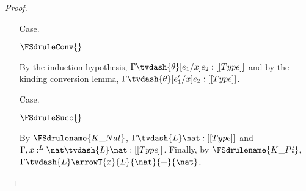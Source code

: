 \begin{proof}
\begin{itemize}
  \item[Case.] \ \\
    \begin{center}
      $\FSdruleConv{}$
    \end{center}
    By the induction hypothesis, $\Gamma \tvdash{\theta} [e_1/x]e_2:[[Type]]$ and by the kinding 
    conversion lemma, $\Gamma \tvdash{\theta} [e'_1/x]e_2:[[Type]]$.

  \item[Case.] \ \\
    \begin{center}
      $\FSdruleSucc{}$
    \end{center}
    By $\FSdrulename{K\_Nat}$, $\Gamma \tvdash{L} \nat:[[Type]]$ and 
    $\Gamma,x:^L \nat \tvdash{L} \nat:[[Type]]$.  Finally, by $\FSdrulename{K\_Pi}$,
    $\Gamma \tvdash{L} \arrowT{x}{L}{\nat}{+}{\nat}$.
    
    







\end{itemize}
\end{proof}
